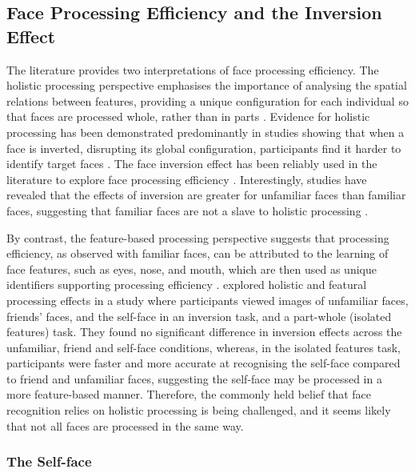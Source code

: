 \documentclass[
  authoryear,
  review,
  3p,
  onecolumn]{elsarticle}
\begin{document}
\subsection{Face Processing Efficiency and the Inversion
Effect}\label{face-processing-efficiency-and-the-inversion-effect}

The literature provides two interpretations of face processing
efficiency. The holistic processing perspective emphasises the
importance of analysing the spatial relations between features,
providing a unique configuration for each individual so that faces are
processed whole, rather than in parts
\citep{sandford2014a, maurer_many_2002}. Evidence for holistic
processing has been demonstrated predominantly in studies showing that
when a face is inverted, disrupting its global configuration,
participants find it harder to identify target faces
\citep{taubert2011a, tong1999a}. The face inversion effect has been
reliably used in the literature to explore face processing efficiency
\citep{rossion_picture-plane_2008, valentine_upside-down_1988, taubert_effect_2015}.
Interestingly, studies have revealed that the effects of inversion are
greater for unfamiliar faces than familiar faces, suggesting that
familiar faces are not a slave to holistic processing
\citep{ramon2016a, oleggio2017a, waidmann_local_2022}.

By contrast, the feature-based processing perspective suggests that
processing efficiency, as observed with familiar faces, can be
attributed to the learning of face features, such as eyes, nose, and
mouth, which are then used as unique identifiers supporting processing
efficiency \citep{abudarham2016a}. \citet{lee2022a} explored holistic
and featural processing effects in a study where participants viewed
images of unfamiliar faces, friends' faces, and the self-face in an
inversion task, and a part-whole (isolated features) task. They found no
significant difference in inversion effects across the unfamiliar,
friend and self-face conditions, whereas, in the isolated features task,
participants were faster and more accurate at recognising the self-face
compared to friend and unfamiliar faces, suggesting the self-face may be
processed in a more feature-based manner. Therefore, the commonly held
belief that face recognition relies on holistic processing is being
challenged, and it seems likely that not all faces are processed in the
same way.

\subsubsection{The Self-face}\label{the-self-face}
\end{document}
